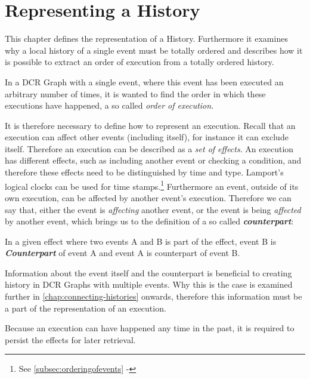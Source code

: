 \chapter{Representing a History}\label{chap:representing-a-history}
	This chapter defines the representation of a History. Furthermore it examines why a local history of a single event must be totally ordered and describes how it is possible to extract an order of execution from a totally ordered history.
	
	\newpar	In a DCR Graph with a single event, where this event has been executed an arbitrary number of times, it is wanted to find the order in which these executions have happened, a so called \textit{order of execution}.
	
	\newpar	It is therefore necessary to define how to represent an execution. Recall that an execution can affect other events (including itself), for instance it can exclude itself. Therefore an execution can be described as a \textit{set of effects}. An execution has different effects, such as including another event or checking a condition, and therefore these effects need to be distinguished by time and type. Lamport's logical clocks can be used for time stamps.\footnote{See \autoref{subsec:orderingofevents} - } Furthermore an event, outside of its own execution, can be affected by another event's execution. Therefore we can say that, either the event is \textit{affecting} another event, or the event is being \textit{affected} by another event, which brings us to the definition of a so called \textit{\textbf{counterpart}}:

	\begin{definition}
		In a given effect where two events A and B is part of the effect, event B is \textbf{\textit{Counterpart}} of event A and event A is counterpart of event B.
	\end{definition}
	
	\newpar Information about the event itself and the counterpart is beneficial to creating history in DCR Graphs with multiple events. Why this is the case is examined further in \autoref{chap:connecting-histories} onwards, therefore this information must be a part of the representation of an execution.
	
	\newpar Because an execution can have happened any time in the past, it is required to persist the effects for later retrieval.
	
